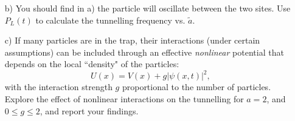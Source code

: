 \documentclass[11pt]{article}
\begin{document}
\begin{enumerate}
\item [b)] You should find in a) the particle will oscillate between the two sites. Use $P_L(t)$ to calculate the tunnelling frequency vs. $\tilde a$.

\item [c)] If many particles are in the trap, their interactions (under certain assumptions) can be included through an effective \emph{nonlinear} potential that depends on the local ``density" of the particles:
\begin{equation}
U (x) =  V(x) + g |\psi(x,t)|^2,
\end{equation}
with the interaction strength $g$ proportional to the number of particles. Explore the effect of nonlinear interactions on the tunnelling for $a =2$, and $ 0 \leq g \leq 2$, and report your findings.

\end{enumerate}
\vspace{1cm}


%

\end{document}

